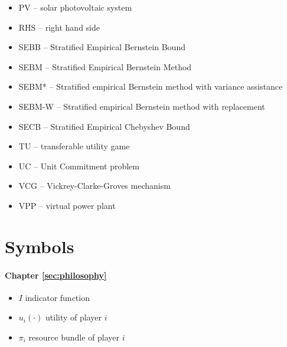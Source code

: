 \begin{itemize}
\item	PV -- solar photovoltaic system
\item	RHS -- right hand side
\item	SEBB -- Stratified Empirical Bernstein Bound
\item	SEBM -- Stratified Empirical Bernstein Method
\item	SEBM* -- Stratified empirical Bernstein method with variance assistance
\item	SEBM-W -- Stratified empirical Bernstein method with replacement
\item	SECB -- Stratified Empirical Chebyshev Bound
\item	TU -- transferable utility game
\item	UC -- Unit Commitment problem
\item	VCG -- Vickrey-Clarke-Groves mechanism
\item	VPP -- virtual power plant
\end{itemize}

\section*{Symbols}

\paragraph{Chapter \ref{sec:philosophy}}
\begin{itemize}
\item	$I$ indicator function
\item	$u_i(\cdot)$ utility of player $i$
\item	$\pi_i$ resource bundle of player $i$
\end{itemize}

